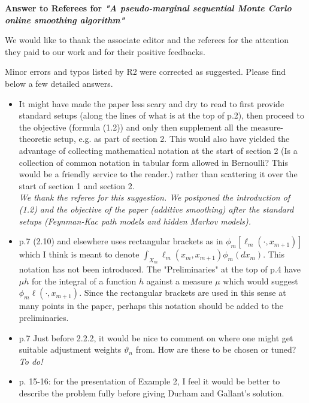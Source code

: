 \documentclass[12pt]{amsart}
\begin{document}
\begin{center}
\textbf{Answer to Referees for \textit{"A pseudo-marginal sequential Monte Carlo online smoothing algorithm"}}
\end{center}

\bigskip

We would like to thank the associate editor and the referees for the attention they paid to our work and for their positive feedbacks. 

\bigskip

Minor errors and typos listed by R2 were corrected as suggested. Please find below a few detailed answers.


\begin{itemize}
\item It might have made the paper less scary and dry to read to first provide standard setups (along the lines of what is at the top of p.2), then proceed to the objective (formula (1.2)) and only then supplement all the measure-theoretic setup, e.g. as part of section 2. This would also have yielded the advantage of collecting mathematical notation at the start of section 2 (Is a collection of common notation in tabular form allowed in Bernoulli? This would be a friendly service to the reader.) rather than scattering it over the start of section 1 and section 2.\\
{\em We thank the referee for this suggestion. We postponed the introduction of (1.2)  and the objective of the paper (additive smoothing) after the standard setups (Feynman-Kac path models and hidden Markov models).}
\item p.7 (2.10) and elsewhere uses rectangular brackets as in $\phi_m[\ell_m(\cdot,x_{m+1})]$ which I think is meant to denote $\int_{X_m}\ell_m(x_m,x_{m+1})\phi_m(dx_m)$. This notation has not been introduced. The "Preliminaries" at the top of p.4 have $\mu h$ for the integral of a function $h$ against a measure $\mu$ which would suggest $\phi_m \ell(\cdot,x_{m+1})$. Since the rectangular brackets are used in this sense at many points in the paper, perhaps this notation should be added to the preliminaries.\\
{\em }
\item p.7 Just before 2.2.2, it would be nice to comment on where one might get suitable adjustment weights $\vartheta_n$ from. How are these to be chosen or tuned?\\
{\em To do!}
\item p. 15-16: for the presentation of Example 2, I feel it would be better to describe the problem fully before giving Durham and Gallant's solution.\\

\end{itemize}
\end{document}
